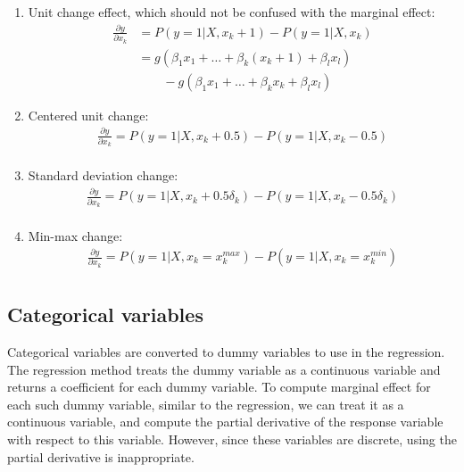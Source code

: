 \begin{enumerate}
  \item Unit change effect, which should not be confused with the
marginal effect:
\begin{align*}
   \frac{\partial y}{\partial x_k} & = P(y=1|X,x_k+1) - P(y=1|X, x_k) \\
                                     & = g( \beta_1 x_1 + \dots  + \beta_k (x_k+1) + \beta_l x_l) \\
                                    & \qquad  - g( \beta_1 x_1 + \dots  + \beta_k x_k + \beta_l x_l)
 \end{align*}
    \item Centered unit change:
        \begin{gather*}
          \frac{\partial y}{\partial x_k} = P(y=1|X,x_k+0.5) - P(y=1|X, x_k-0.5) \\
        \end{gather*}
    \item Standard deviation change:
        \begin{gather*}
          \frac{\partial y}{\partial x_k} = P(y=1|X,x_k+0.5\delta_k) - P(y=1|X, x_k-0.5\delta_k) \\
        \end{gather*}
    \item Min-max change:
        \begin{gather*}
          \frac{\partial y}{\partial x_k} = P(y=1|X,x_k=x_k^{max}) - P(y=1|X, x_k=x_k^{min}) \\
        \end{gather*}
\end{enumerate}

\subsection{Categorical variables} %
\label{sub:categorical_variables}
Categorical variables are converted to dummy variables to use in the regression.
The regression method treats the dummy variable as a continuous variable and
returns a coefficient for each dummy variable.
To compute marginal effect for each such dummy variable, similar to the
regression, we can treat it as a continuous variable, and
compute the partial derivative of the response variable with respect to this variable.
However, since these variables are discrete, using the partial derivative is inappropriate.


